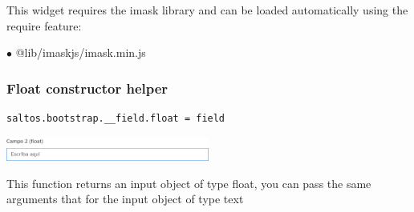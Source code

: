 \documentclass[a4paper]{article}
\begin{document}
This widget requires the imask library and can be loaded automatically using the require
feature:

\begin{compactitem}
\item[\color{myblue}$\bullet$] @lib/imaskjs/imask.min.js
\end{compactitem}

\hypertarget{toc53}{}
\subsubsection{Float constructor helper}

\begin{lstlisting}
saltos.bootstrap.__field.float = field
\end{lstlisting}

\begin{center}\includegraphics[width=0.5\textwidth]{../ujest/snaps/test-bootstrap-js-bootstrap-campo-2-float-1-snap.png}\end{center}

This function returns an input object of type float, you can pass the same arguments
that for the input object of type text
\end{document}
